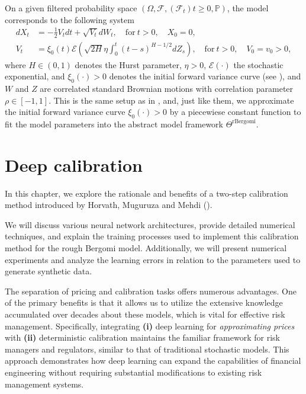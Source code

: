 \documentclass{article}
\theoremstyle{remark}
\begin{document}
On a given filtered probability space $(\Omega, \mathcal{F}, (\mathcal{F}_t){t \ge 0}, \mathbb{P})$, the model
corresponds to the following system
\begin{subequations}
  \label{eq:rbergomi}
  \begin{align}
    dX_t & =-\frac{1}{2} V_t dt +\sqrt{V_t} dW_t,\quad \textrm{for} \ t>0, \quad X_0=0, \\
    V_t  & =\xi_0(t)\mathcal{E}\left(\sqrt{2H}\eta \int_0^t
          (t-s)^{H-1/2}dZ_s\right),\quad \textrm{for} \ t>0, \quad V_0=v_0>0, 
  \end{align}
\end{subequations}
where $H \in (0,1)$ denotes the Hurst parameter, $\eta>0$,
$\mathcal{E}(\cdot)$ the stochastic exponential,
and $\xi_0(\cdot) >0$ denotes the initial forward variance curve (see \cite[Section 6]{BergomiBook}),
and $W$ and $Z$ are correlated standard Brownian motions with correlation parameter $\rho\in [-1,1]$.
This is the same setup as in \cite{HMM19}, and, just like them, we approximate the initial forward variance curve $\xi_0 (\cdot) > 0$
by a piecewiese constant function to fit the model parameters into the abstract model framework $\Theta^{\mathrm{rBergomi}}$.

\section{Deep calibration}
\label{sec:pricing}
In this chapter, we explore the rationale and benefits of a two-step calibration method
introduced by Horvath, Muguruza and Mehdi (\cite{HMM19}).

We will discuss various neural network architectures,
provide detailed numerical techniques,
and explain the training processes used to implement this calibration method 
for the rough Bergomi model.
Additionally, we will present numerical experiments and analyze the
learning errors in relation to the parameters used to generate synthetic data.

The separation of pricing and calibration tasks offers numerous advantages.
One of the primary benefits is that it allows us to utilize the extensive knowledge
accumulated over decades about these models, which is vital for effective risk management.
Specifically, integrating
\textbf{(i)} deep learning for \emph{approximating prices} with
\textbf{(ii)} deterministic calibration maintains the familiar framework for risk managers and regulators,
similar to that of traditional stochastic models.
This approach demonstrates how deep learning can expand the capabilities of financial engineering 
without requiring substantial modifications to existing risk management systems.
\end{document}
